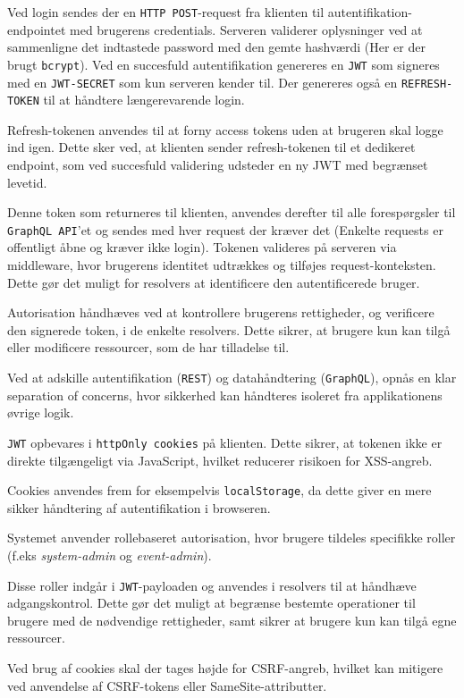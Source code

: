 Ved login sendes der en \texttt{HTTP POST}-request fra klienten til autentifikation-endpointet med brugerens credentials.
Serveren validerer oplysninger ved at sammenligne det indtastede password med den gemte hashværdi (Her er der brugt \texttt{bcrypt}).
Ved en succesfuld autentifikation genereres en \texttt{JWT} som signeres med en \texttt{JWT-SECRET} som kun serveren kender til.
Der genereres også en \texttt{REFRESH-TOKEN} til at håndtere længerevarende login.

Refresh-tokenen anvendes til at forny access tokens uden at brugeren skal logge ind igen.
Dette sker ved, at klienten sender refresh-tokenen til et dedikeret endpoint,
som ved succesfuld validering udsteder en ny JWT med begrænset levetid.

Denne token som returneres til klienten, anvendes derefter til alle forespørgsler til \texttt{GraphQL API}'et og sendes med
hver request der kræver det (Enkelte requests er offentligt åbne og kræver ikke login).
Tokenen valideres på serveren via middleware, hvor brugerens identitet udtrækkes og tilføjes request-konteksten.
Dette gør det muligt for resolvers at identificere den autentificerede bruger.

Autorisation håndhæves ved at kontrollere brugerens rettigheder, og verificere den signerede token, i de enkelte resolvers.
Dette sikrer, at brugere kun kan tilgå eller modificere ressourcer, som de har tilladelse til.

Ved at adskille autentifikation (\texttt{REST}) og datahåndtering (\texttt{GraphQL}), opnås en klar separation of concerns,
hvor sikkerhed kan håndteres isoleret fra applikationens øvrige logik.

\texttt{JWT} opbevares i \texttt{httpOnly cookies} på klienten.
Dette sikrer, at tokenen ikke er direkte tilgængeligt via JavaScript, hvilket reducerer risikoen for XSS-angreb.

Cookies anvendes frem for eksempelvis \texttt{localStorage}, da dette giver en mere sikker håndtering af autentifikation
i browseren.

Systemet anvender rollebaseret autorisation, hvor brugere tildeles specifikke roller (f.eks \textit{system-admin} og \textit{event-admin}).

Disse roller indgår i \texttt{JWT}-payloaden og anvendes i resolvers til at håndhæve adgangskontrol.
Dette gør det muligt at begrænse bestemte operationer til brugere med de nødvendige rettigheder, samt sikrer at brugere
kun kan tilgå egne ressourcer.

Ved brug af cookies skal der tages højde for CSRF-angreb, hvilket kan mitigere ved anvendelse af CSRF-tokens eller SameSite-attributter.


